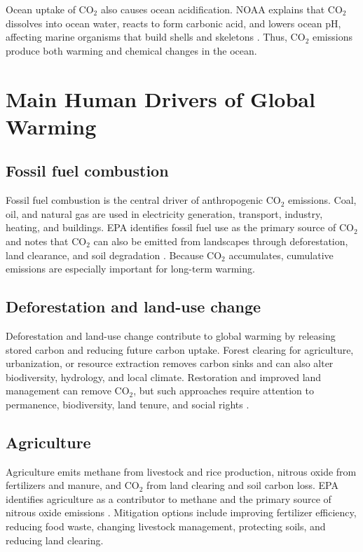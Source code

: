 \documentclass[12pt]{article}
\begin{document}
Ocean uptake of CO$_2$ also causes ocean acidification. NOAA explains that CO$_2$ dissolves into ocean water, reacts to form carbonic acid, and lowers ocean pH, affecting marine organisms that build shells and skeletons \cite{ref3}. Thus, CO$_2$ emissions produce both warming and chemical changes in the ocean.

\section{Main Human Drivers of Global Warming}

\subsection{Fossil fuel combustion}

Fossil fuel combustion is the central driver of anthropogenic CO$_2$ emissions. Coal, oil, and natural gas are used in electricity generation, transport, industry, heating, and buildings. EPA identifies fossil fuel use as the primary source of CO$_2$ and notes that CO$_2$ can also be emitted from landscapes through deforestation, land clearance, and soil degradation \cite{ref4}. Because CO$_2$ accumulates, cumulative emissions are especially important for long-term warming.

\subsection{Deforestation and land-use change}

Deforestation and land-use change contribute to global warming by releasing stored carbon and reducing future carbon uptake. Forest clearing for agriculture, urbanization, or resource extraction removes carbon sinks and can also alter biodiversity, hydrology, and local climate. Restoration and improved land management can remove CO$_2$, but such approaches require attention to permanence, biodiversity, land tenure, and social rights \cite{ref1,ref4}.

\subsection{Agriculture}

Agriculture emits methane from livestock and rice production, nitrous oxide from fertilizers and manure, and CO$_2$ from land clearing and soil carbon loss. EPA identifies agriculture as a contributor to methane and the primary source of nitrous oxide emissions \cite{ref4}. Mitigation options include improving fertilizer efficiency, reducing food waste, changing livestock management, protecting soils, and reducing land clearing.
\end{document}
